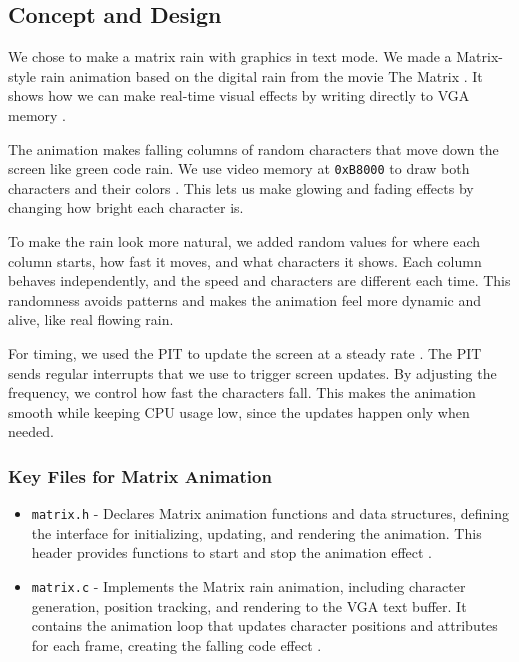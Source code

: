 \documentclass[a4paper,11pt]{article}
\begin{document}
\subsection{Concept and Design}

We chose to make a matrix rain with graphics in text mode. We made a Matrix-style rain animation based on the digital rain from the movie The Matrix \cite{matrixRainFilm} \cite{matrixRainKode}. It shows how we can make real-time visual effects by writing directly to VGA memory \cite{VGA}.

The animation makes falling columns of random characters that move down the screen like green code rain. We use video memory at \texttt{0xB8000} to draw both characters and their colors \cite{VGA}. This lets us make glowing and fading effects by changing how bright each character is.

To make the rain look more natural, we added random values for where each column starts, how fast it moves, and what characters it shows. Each column behaves independently, and the speed and characters are different each time. This randomness avoids patterns and makes the animation feel more dynamic and alive, like real flowing rain.

For timing, we used the PIT to update the screen at a steady rate \cite{OSDev_PIT}. The PIT sends regular interrupts that we use to trigger screen updates. By adjusting the frequency, we control how fast the characters fall. This makes the animation smooth while keeping CPU usage low, since the updates happen only when needed.


\subsubsection{Key Files for Matrix Animation}
\begin{itemize}
    \item \texttt{matrix.h} - Declares Matrix animation functions and data structures, defining the interface for initializing, updating, and rendering the animation. This header provides functions to start and stop the animation effect \cite{matrixRainFilm} \cite{matrixRainKode}.
    
    \item \texttt{matrix.c} - Implements the Matrix rain animation, including character generation, position tracking, and rendering to the VGA text buffer. It contains the animation loop that updates character positions and attributes for each frame, creating the falling code effect\cite{matrixRainFilm} \cite{matrixRainKode} \cite{VGA}.
\end{itemize}
\end{document}
